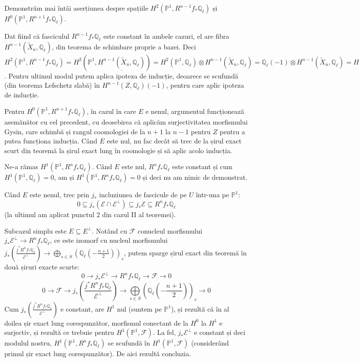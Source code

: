 \documentclass[13pt,openany]{book}
\begin{document}
Demonstrăm mai întâi aserțiunea despre spațiile $H^2(\mathbb{P}^1,R^{n-1} f_* \mathbb{Q}_\ell)$ și $H^0(\mathbb{P}^1,R^{n+1} f_* \mathbb{Q}_\ell)$.

Dat fiind că fasciculul $R^{n-1} f_* \mathbb{Q}_\ell$ este constant în ambele cazuri, el are fibra $H^{n-1}(\widetilde{X}_u,\mathbb{Q}_\ell)$, din teorema de schimbare proprie a bazei. Deci $H^2(\mathbb{P}^1,R^{n-1} f_* \mathbb{Q}_\ell) = H^2(\mathbb{P}^1,\underline{H^{n-1}(\widetilde{X}_u,\mathbb{Q}_\ell)}) = H^2(\mathbb{P}^1,\mathbb{Q}_\ell) \otimes H^{n-1}(\widetilde{X}_u,\mathbb{Q}_\ell) = \mathbb{Q}_\ell(-1)\otimes H^{n-1}(\widetilde{X}_u,\mathbb{Q}_\ell) = H^{n-1}(\widetilde{X}_u,\mathbb{Q}_\ell)(-1)$. Pentru ultimul modul putem aplica ipoteza de inducție, deoarece se scufundă (din teorema Lefschetz slabă) în $H^{n-1}(Z,\mathbb{Q}_\ell)(-1)$, pentru care aplic ipoteza de inducție.

Pentru $H^0(\mathbb{P}^1,R^{n+1} f_* \mathbb{Q}_\ell)$, în cazul în care $E$ e nenul, argumentul funcționează asemănător cu cel precedent, cu deosebirea că aplicăm surjectivitatea morfismului Gysin, care schimbă și rangul coomologiei de la $n+1$ la $n-1$ pentru $Z$ pentru a putea funcționa inducția. Când $E$ este nul, nu fac decât să trec de la șirul exact scurt din teoremă la șirul exact lung în coomologie și să aplic acolo inducția.

Ne-a rămas $H^1(\mathbb{P}^1,R^n f_* \mathbb{Q}_\ell)$. Când $E$ este nul, $R^{n} f_* \mathbb{Q}_\ell$ este constant și cum $H^1(\mathbb{P}^1,\mathbb{Q}_\ell)=0$, am și $H^1(\mathbb{P}^1,R^n f_* \mathbb{Q}_\ell)=0$ și deci nu am nimic de demonstrat.

Când $E$ este nenul, trec prin $j_*$ incluziunea de fascicule de pe $U$ într-una pe $\mathbb{P}^1$:
$$0 \subseteq j_*(\mathcal{E} \cap \mathcal{E}^\perp) \subseteq j_*\mathcal{E} \subseteq R^n f_* \mathbb{Q}_\ell$$
(la ultimul am aplicat punctul 2 din cazul II al teoremei).

Subcazul simplu este $E \subseteq E^\perp$. Notând cu $\mathcal{F}$ conucleul morfismului $j_* \mathcal{E}^\perp \rightarrow R^n f_* \mathbb{Q}_\ell$, ce este izomorf cu nucleul morfismului $j_*(\frac{j^* R^n f_* \mathbb{Q}_\ell}{\mathcal{E}^\perp}) \rightarrow \bigoplus\limits_{s\in S} (\mathbb{Q}_\ell(-\frac{n+1}{2}))_s$, putem sparge șirul exact din teoremă în două șiruri exacte scurte:
$$0 \rightarrow j_* \mathcal{E}^\perp \rightarrow R^n f_* \mathbb{Q}_\ell \rightarrow \mathcal{F} \rightarrow 0$$
$$0 \rightarrow \mathcal{F} \rightarrow j_*(\frac{j^* R^n f_* \mathbb{Q}_\ell}{\mathcal{E}^\perp}) \rightarrow \bigoplus\limits_{s\in S} (\mathbb{Q}_\ell(-\frac{n+1}{2}))_s \rightarrow 0$$
Cum $ j_*(\frac{j^* R^n f_* \mathbb{Q}_\ell}{\mathcal{E}^\perp})$ e constant, are $H^1$ nul (suntem pe $\mathbb{P}^1$), și rezultă că în al doilea șir exact lung corespunzător, morfismul conectant de la $H^0$ la $H^1$ e surjectiv, și rezultă ce trebuie pentru $H^1(\mathbb{P}^1,\mathcal{F})$. La fel, $ j_* \mathcal{E}^\perp$ e constant și deci modulul nostru, $H^1(\mathbb{P}^1,R^n f_* \mathbb{Q}_\ell)$ se scufundă în $H^1(\mathbb{P}^1,\mathcal{F})$ (considerând primul șir exact lung corespunzător). De aici rezultă concluzia.
\end{document}
